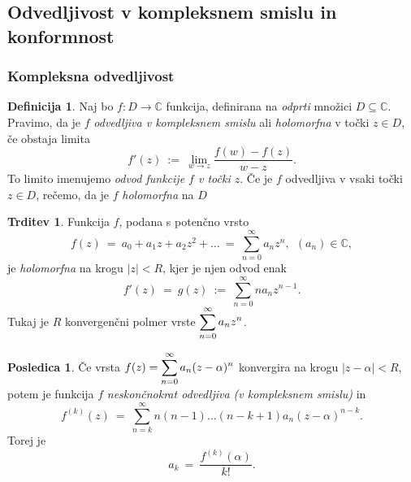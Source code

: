 \documentclass[11pt]{article}
\theoremstyle{definition}
\newtheorem{definicija}{Definicija}[section]
\theoremstyle{definition}
\newtheorem{trditev}{Trditev}[section]
\theoremstyle{definition}
\newtheorem*{posledica}{Posledica}
\begin{document}

\subsection{Odvedljivost v kompleksnem smislu in konformnost}
\vspace{0.5cm}


\subsubsection{Kompleksna odvedljivost}
\vspace{0.5cm}

\begin{definicija}

Naj bo $f: D \rightarrow \mathbb{C}$ funkcija, definirana na \textit{odprti} množici $D \subseteq \mathbb{C}$. Pravimo, da je $f$ \textit{odvedljiva v kompleksnem smislu} ali \textit{holomorfna} v točki $z \in D$, če obstaja limita
$$f'(z) ~:=~ \lim_{w \rightarrow z} \frac{f(w) - f(z)}{w - z}.$$
To limito imenujemo \textit{odvod funkcije $f$ v točki $z$}. Če je $f$ odvedljiva v vsaki točki $z \in D$, rečemo, da je $f$ \textit{holomorfna} na $D$

\end{definicija}
\vspace{0.5cm}

\begin{trditev}

Funkcija $f$, podana s potenčno vrsto 
$$f(z) ~=~ a_0 + a_1 z + a_2 z^2 + \ldots ~=~ \sum_{n=0}^{\infty} a_n z^n, ~~(a_n) \in \mathbb{C},$$
je \textit{holomorfna} na krogu $|z| < R$, kjer je njen odvod enak
$$f'(z) ~=~ g(z) ~:=~ \sum_{n=0}^{\infty} n a_n z^{n-1}.$$
Tukaj je $R$ konvergenčni polmer vrste $\mathlarger{\sum_{n=0}^{\infty} a_n z^n}$. 

\end{trditev}
\vspace{0.5cm}

\begin{posledica}

Če vrsta $f(z) = \mathlarger{\sum_{n=0}^{\infty} a_n (z - \alpha)^n}$ konvergira na krogu $|z - \alpha| < R$, potem je funkcija $f$ \textit{neskončnokrat odvedljiva (v kompleksnem smislu)} in
$$f^{(k)}(z) ~=~ \sum_{n=k}^{\infty} n(n-1) \ldots (n-k+1) a_n (z - \alpha)^{n-k}.$$
Torej je
$$a_k ~=~ \frac{f^{(k)}(\alpha)}{k!}.$$

\end{posledica}
\vspace{0.5cm}
\end{document}
